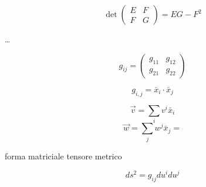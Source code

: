 $$
\det \begin{pmatrix} E & F \\ F & G \end{pmatrix} = EG - F^2
$$

\dots

\newpage

$$
g_{ij} = \begin{pmatrix}
    g_{11} & g_{12} \\
    g_{21} & g_{22}
\end{pmatrix}
$$

$$
g_{i,j} = \bar x_i \cdot \bar x_j
$$

$$
\vec v = \sum_i v^i \bar x_i
$$
$$
\vec w = \sum_j w^j \bar x_j = 
$$

forma matriciale tensore metrico

$$
ds^2 = g_{ij} du^i du^j
$$
